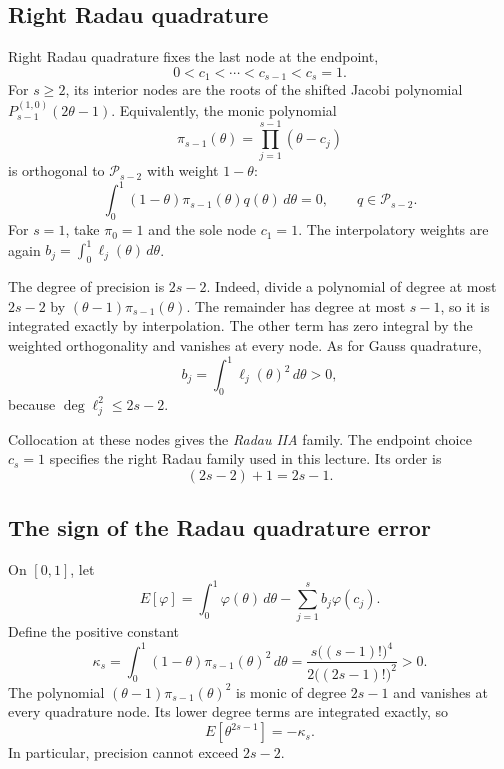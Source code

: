 \subsection{Right Radau quadrature}

Right Radau quadrature fixes the last node at the endpoint,
\[
 0<c_1<\cdots<c_{s-1}<c_s=1.
\]
For \(s\geq2\), its interior nodes are the roots of the shifted
Jacobi polynomial \(P_{s-1}^{(1,0)}(2\theta-1)\). Equivalently,
the monic polynomial
\[
 \pi_{s-1}(\theta)=\prod_{j=1}^{s-1}(\theta-c_j)
\]
is orthogonal to \(\mathcal P_{s-2}\) with weight \(1-\theta\):
\[
 \int_0^1(1-\theta)\pi_{s-1}(\theta)q(\theta)\,d\theta=0,
 \qquad q\in\mathcal P_{s-2}.
\]
For \(s=1\), take \(\pi_0=1\) and the sole node \(c_1=1\).
The interpolatory weights are again
\(b_j=\int_0^1\ell_j(\theta)\,d\theta\).

The degree of precision is \(2s-2\). Indeed, divide a polynomial
of degree at most \(2s-2\) by
\((\theta-1)\pi_{s-1}(\theta)\). The remainder has degree at
most \(s-1\), so it is integrated exactly by interpolation. The
other term has zero integral by the weighted orthogonality and
vanishes at every node. As for Gauss quadrature,
\[
 b_j=\int_0^1\ell_j(\theta)^2\,d\theta>0,
\]
because \(\deg\ell_j^2\leq2s-2\).

Collocation at these nodes gives the \emph{Radau IIA} family.
The endpoint choice \(c_s=1\) specifies the right Radau family
used in this lecture. Its order is
\[
 (2s-2)+1=2s-1.
\]

\subsection{The sign of the Radau quadrature error}

On \([0,1]\), let
\[
 E[\varphi]=\int_0^1\varphi(\theta)\,d\theta
                   -\sum_{j=1}^s b_j\varphi(c_j).
\]
Define the positive constant
\begin{equation}\label{eq:radau-error-constant-sep-25}
 \kappa_s=\int_0^1(1-\theta)\pi_{s-1}(\theta)^2\,d\theta
   =\frac{s\bigl((s-1)!\bigr)^4}{2\bigl((2s-1)!\bigr)^2}>0.
\end{equation}
The polynomial \((\theta-1)\pi_{s-1}(\theta)^2\) is monic of
degree \(2s-1\) and vanishes at every quadrature node. Its lower
degree terms are integrated exactly, so
\begin{equation}\label{eq:radau-leading-error-sep-25}
 E[\theta^{2s-1}]=-\kappa_s.
\end{equation}
In particular, precision cannot exceed \(2s-2\).

